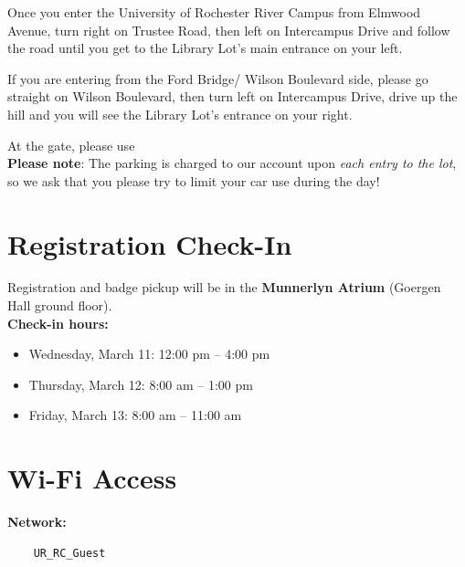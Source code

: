 \documentclass[11pt]{article}
\begin{document}
Once you enter the University of Rochester River Campus from Elmwood
Avenue, turn right on Trustee Road, then left on Intercampus Drive and follow the
road until you get to the Library Lot’s main entrance on your left.


If you are entering from the Ford Bridge/ Wilson Boulevard side, please go
straight on Wilson Boulevard, then turn left on Intercampus Drive, drive up the
hill and you will see the Library Lot’s entrance on your right.

At the gate, please use \\

\textbf{Please note}: The parking is charged to our account upon \textit{each entry 
to the lot}, so we ask that you please try to limit your car use during the day! 



\section{Registration Check-In}

Registration and badge pickup will be in the \textbf{Munnerlyn Atrium} (Goergen Hall ground floor).\\[0.3em]
\textbf{Check-in hours:}
\begin{itemize}
    \item Wednesday, March 11: 12:00 pm -- 4:00 pm
    \item Thursday, March 12: 8:00 am -- 1:00 pm
    \item Friday, March 13: 8:00 am -- 11:00 am
\end{itemize}

\section{Wi-Fi Access}

\textbf{Network:} \begin{verbatim}
	UR_RC_Guest
\end{verbatim}

%
\end{document}
